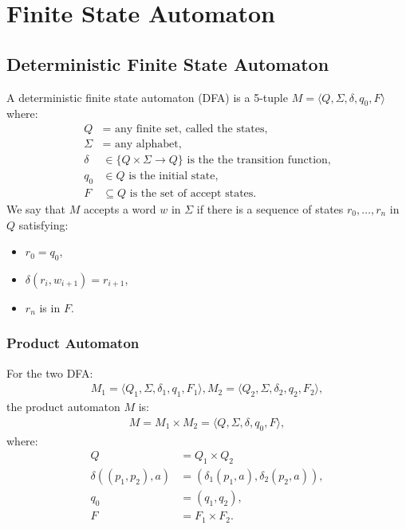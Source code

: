 \section{Finite State Automaton}

\subsection{Deterministic Finite State Automaton}

A deterministic finite state automaton (DFA) is a 5-tuple 
$M = \langle Q, \Sigma, \delta, q_0, F \rangle$
where: \begin{align*}
    Q      &= \text{ any finite set, called the states,} \\
    \Sigma &= \text{ any alphabet,} \\ 
    \delta &\in \{ Q \times \Sigma \to Q \} \text{ is the the transition function,} \\
    q_0    &\in Q \text{ is the initial state,} \\
    F      &\subseteq Q \text{ is the set of accept states.}
\end{align*} We say that $M$ accepts a word $w$ in $\Sigma$
if there is a sequence of states $r_0, \ldots, r_n$ in $Q$
satisfying: \begin{itemize}
    \item $r_0 = q_0$,
    \item $\delta(r_i, w_{i + 1}) = r_{i + 1}$,
    \item $r_n$ is in $F$.
\end{itemize}

\subsubsection{Product Automaton}

For the two DFA: \begin{align*}
    M_1 = \langle Q_1, \Sigma, \delta_1, q_1, F_1 \rangle,
    M_2 = \langle Q_2, \Sigma, \delta_2, q_2, F_2 \rangle,
\end{align*} the product automaton $M$ is: \begin{gather*}
    M = M_1 \times M_2 = \langle Q, \Sigma, \delta, q_0, F \rangle,
\end{gather*} where: \begin{align*}
    Q &= Q_1 \times Q_2 \\
    \delta((p_1, p_2), a) &= (\delta_1(p_1, a), \delta_2(p_2, a)), \\
    q_0 &= (q_1, q_2), \\
    F &= F_1 \times F_2.
\end{align*}

